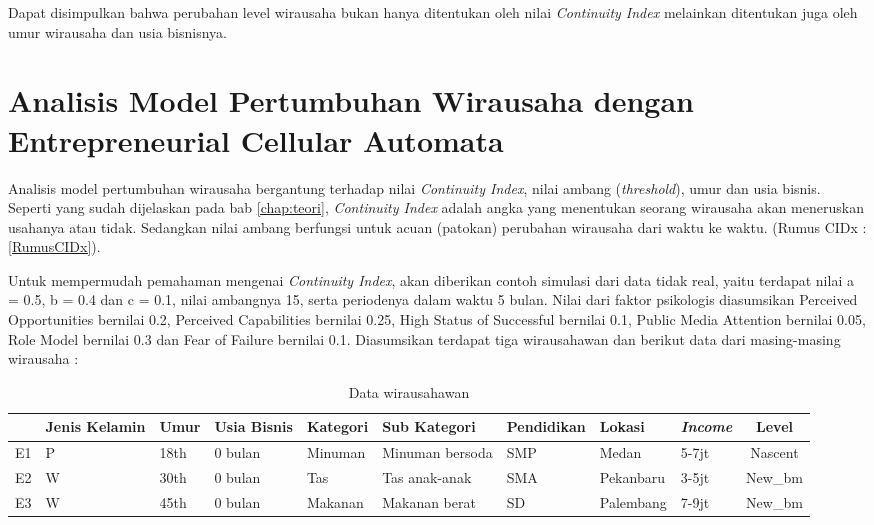 Dapat disimpulkan bahwa perubahan level wirausaha bukan hanya ditentukan oleh nilai \textit{Continuity Index} melainkan ditentukan juga oleh umur wirausaha dan usia bisnisnya.


\section{Analisis Model Pertumbuhan Wirausaha dengan Entrepreneurial Cellular Automata}
\label{analisismodelCA}

Analisis model pertumbuhan wirausaha bergantung terhadap nilai \textit{Continuity Index}, nilai ambang (\textit{threshold}), umur dan usia bisnis. Seperti yang sudah dijelaskan pada bab \ref{chap:teori}, \textit{Continuity Index} adalah angka yang menentukan seorang wirausaha akan meneruskan usahanya atau tidak. Sedangkan nilai ambang berfungsi untuk acuan (patokan) perubahan wirausaha dari waktu ke waktu. (Rumus CIDx : \ref{RumusCIDx}).


Untuk mempermudah pemahaman mengenai \textit{Continuity Index}, akan diberikan contoh simulasi dari data tidak real, yaitu terdapat nilai a = 0.5, b = 0.4 dan c = 0.1, nilai ambangnya 15, serta periodenya dalam waktu 5 bulan. Nilai dari faktor psikologis diasumsikan Perceived Opportunities bernilai 0.2, Perceived Capabilities bernilai 0.25, High Status of Successful bernilai 0.1, Public Media Attention bernilai 0.05, Role Model bernilai 0.3 dan Fear of Failure bernilai 0.1. Diasumsikan terdapat tiga wirausahawan dan berikut data dari masing-masing wirausaha :
				
\begin{table} [H]
\centering
\caption{Data wirausahawan}
\begin{tabular}{|c|p{1cm}|p{1cm}|p{1cm}|p{2cm}|p{2cm}|p{2cm}|p{2cm}|p{1cm}|c|}
\hline
& Jenis Kelamin & Umur & Usia Bisnis & Kategori & Sub Kategori & Pendidikan & Lokasi & \textit{Income} & Level\\
\hline
E1 & P & 18th & 0 bulan & Minuman & Minuman bersoda & SMP & Medan & 5-7jt & Nascent\\
\hline
E2 & W & 30th & 0 bulan & Tas & Tas anak-anak  & SMA & Pekanbaru & 3-5jt & New\_bm\\
\hline
E3 & W & 45th & 0 bulan & Makanan & Makanan berat & SD & Palembang & 7-9jt & New\_bm\\
\hline
\end{tabular}
\end{table}

